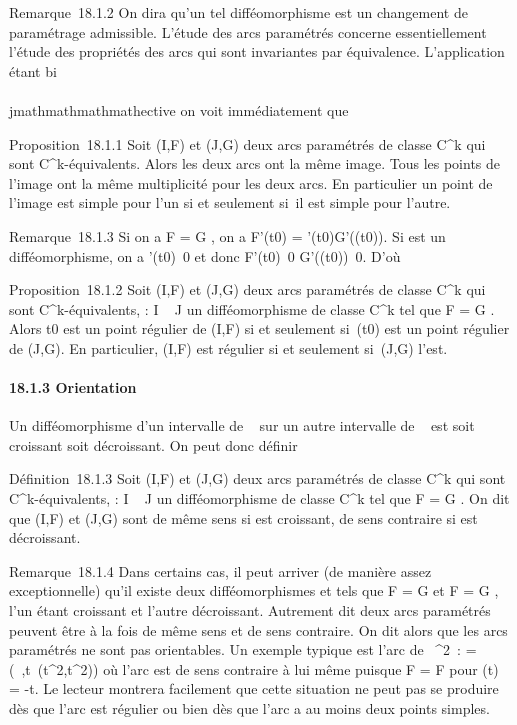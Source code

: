 Remarque~18.1.2 On dira qu'un tel difféomorphisme est un changement de
paramétrage admissible. L'étude des arcs paramétrés concerne
essentiellement l'étude des propriétés des arcs qui sont invariantes par
équivalence. L'application \theta étant bi\\\\jmathmathmathmathective on voit immédiatement que

Proposition~18.1.1 Soit (I,F) et (J,G) deux arcs paramétrés de classe
C^k qui sont C^k-équivalents. Alors les deux arcs
ont la même image. Tous les points de l'image ont la même multiplicité
pour les deux arcs. En particulier un point de l'image est simple pour
l'un si et seulement si~il est simple pour l'autre.

Remarque~18.1.3 Si on a F = G \cdot \theta, on a F'(t0) =
\theta'(t0)G'(\theta(t0)). Si \theta est un difféomorphisme, on a
\theta'(t0)\neq~0 et donc
F'(t0)\neq~0
\Leftrightarrow
G'(\theta(t0))\neq~0. D'où

Proposition~18.1.2 Soit (I,F) et (J,G) deux arcs paramétrés de classe
C^k qui sont C^k-équivalents, \theta : I \rightarrow~ J un
difféomorphisme de classe C^k tel que F = G \cdot \theta. Alors
t0 est un point régulier de (I,F) si et seulement
si~\theta(t0) est un point régulier de (J,G). En particulier, (I,F)
est régulier si et seulement si~(J,G) l'est.

\paragraph{18.1.3 Orientation}

Un difféomorphisme d'un intervalle de ~ sur un autre intervalle de ~ est
soit croissant soit décroissant. On peut donc définir

Définition~18.1.3 Soit (I,F) et (J,G) deux arcs paramétrés de classe
C^k qui sont C^k-équivalents, \theta : I \rightarrow~ J un
difféomorphisme de classe C^k tel que F = G \cdot \theta. On dit que
(I,F) et (J,G) sont de même sens si \theta est croissant, de sens contraire
si \theta est décroissant.

Remarque~18.1.4 Dans certains cas, il peut arriver (de manière assez
exceptionnelle) qu'il existe deux difféomorphismes  et
 tels que F = G \cdot {} et F = G \cdot {}, l'un
étant croissant et l'autre décroissant. Autrement dit deux arcs
paramétrés peuvent être à la fois de même sens et de sens contraire. On
dit alors que les arcs paramétrés ne sont pas orientables. Un exemple
typique est l'arc de ~^2~: \Gamma =
(~,t\mapsto~(t^2,t^2)) où
l'arc est de sens contraire à lui même puisque F \cdot \theta = F pour \theta(t) = -t.
Le lecteur montrera facilement que cette situation ne peut pas se
produire dès que l'arc est régulier ou bien dès que l'arc a au moins
deux points simples.

